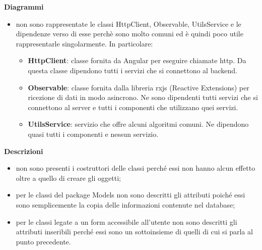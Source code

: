 \textbf{Diagrammi}
\begin{itemize}
	\item non sono rappresentate le classi HttpClient, Observable, UtilsService e le dipendenze verso di esse perchè sono molto comuni ed è quindi poco utile rappresentarle singolarmente. In particolare:
	\begin{itemize}
		\item \textbf{HttpClient}: classe fornita da Angular per eseguire chiamate http. Da questa classe dipendono tutti i servizi che si connettono al backend.
		\item \textbf{Observable}: classe fornita dalla libreria rxjs (Reactive Extensions) per ricezione di dati in modo asincrono. Ne sono dipendenti tutti servizi che si connettono al server e tutti i componenti che utilizzano quei servizi.
		\item \textbf{UtilsService}: servizio che offre alcuni algoritmi comuni. Ne dipendono quasi tutti i componenti e nessun servizio.
	\end{itemize}
\end{itemize}
\textbf{Descrizioni}
\begin{itemize}
	\item non sono presenti i costruttori delle classi perché essi non hanno alcun effetto oltre a quello di creare gli oggetti;
	\item per le classi del package Models non sono descritti gli attributi poiché essi sono semplicemente la copia delle informazioni contenute nel database;
	\item per le classi legate a un form accessibile all'utente non sono descritti gli attributi inseribili perché essi sono un sottoinsieme di quelli di cui si parla al punto precedente.
\end{itemize}

